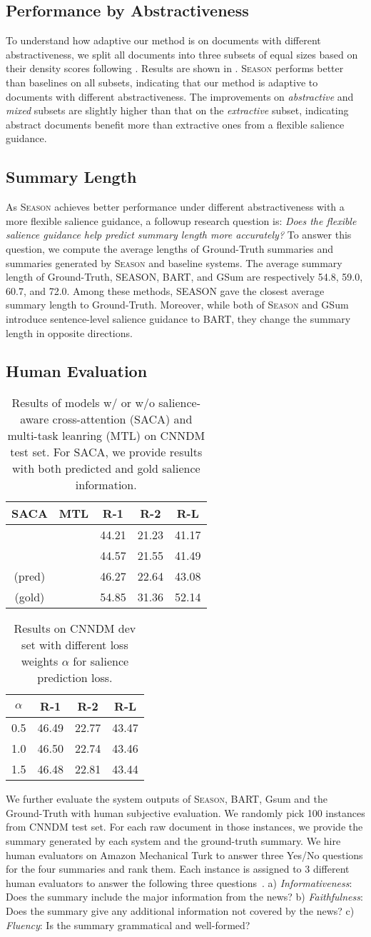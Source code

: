 \documentclass[11pt]{article}
\newcommand{\cmark}{\ding{51}}\newcommand{\xmark}{\ding{55}}
\newcommand{\MODEL}{\mbox{\textsc{Season}}\xspace}
\newcommand{\TABLESALIENCEINJECTION}{
    \begin{table}[!t]
        \centering
        \small
        \begin{tabular}{ccccc}\toprule
            \textbf{SACA} & \textbf{MTL} &\textbf{R-1} &\textbf{R-2} &\textbf{R-L} \\\midrule
            \xmark & \xmark  & 44.21 & 21.23 & 41.17 \\
            \xmark & \cmark & 44.57 & 21.55 & 41.49 \\
            \cmark (pred) & \cmark & 46.27 & 22.64 & 43.08 \\
            \cmark (gold) & \cmark & 54.85 & 31.36 & 52.14 \\
            \bottomrule
        \end{tabular}
        \caption{\small Results of models w/ or w/o salience-aware cross-attention (SACA) and multi-task leanring (MTL) on CNNDM test set. For SACA, we provide results with both predicted and gold salience information.}
        \label{tab:ablation_module}
        \vspace{-0.5em}
    \end{table}
}
\newcommand{\TABLEAUXILIARYTASK}{
    \begin{table}[!t]
    \centering
    \small
    \begin{tabular}{cccc}\toprule
        $\alpha$ &\textbf{R-1} &\textbf{R-2} &\textbf{R-L} \\\midrule
        
         0.5 & 46.49 & 22.77 & 43.47 \\
         1.0 & 46.50 & 22.74 & 43.46 \\
         1.5 & 46.48 & 22.81 & 43.44  \\
        \bottomrule
    \end{tabular}
    \caption{\small Results on CNNDM dev set with different loss weights $\alpha$ for salience prediction loss.}
    \label{tab:coefficient}
    \vspace{-1em}
    \end{table}
}
\begin{document}
\subsection{Performance by Abstractiveness}
\label{sec:abstractiveness}
To understand how adaptive our method is on documents with different abstractiveness, we split all documents into three subsets of equal sizes based on their density scores following \citet{grusky2018newsroom}. Results are shown in . \MODEL performs better than baselines on all subsets, indicating that our method is adaptive to documents with different abstractiveness. The improvements on \textit{abstractive} and \textit{mixed} subsets are slightly higher than that on the \textit{extractive} subset, indicating abstract documents benefit more than extractive ones from a flexible salience guidance.


\subsection{Summary Length}
\label{sec:length}
As \MODEL achieves better performance under different abstractiveness with a more flexible salience guidance, a followup research question is: \textit{Does the flexible salience guidance help predict summary length more accurately?}
To answer this question, we compute the average lengths of Ground-Truth summaries and summaries generated by \MODEL and baseline systems.
The average summary length of Ground-Truth, SEASON, BART, and GSum are respectively 54.8, 59.0, 60.7, and 72.0.
Among these methods, SEASON gave the closest average summary length to Ground-Truth.
Moreover, while both of \MODEL and GSum introduce sentence-level salience guidance to BART, they change the summary length in opposite directions.



\subsection{Human Evaluation}
\label{sec:human}
\TABLESALIENCEINJECTION
\TABLEAUXILIARYTASK

We further evaluate the system outputs of \MODEL, BART, Gsum and the Ground-Truth with human subjective evaluation.
We randomly pick 100 instances from CNNDM test set.
For each raw document in those instances, we provide the summary generated by each system and the ground-truth summary.
We hire human evaluators on Amazon Mechanical Turk to answer three Yes/No questions for the four summaries and rank them.
Each instance is assigned to 3 different human evaluators to answer the following
three questions~\cite{song-etal-2021-new}. 
a) \textit{Informativeness}: Does the summary include the major information from the news? 
b) \textit{Faithfulness}: Does the summary give any additional information not covered by the news? 
c) \textit{Fluency}: Is the summary grammatical and well-formed?
\end{document}
